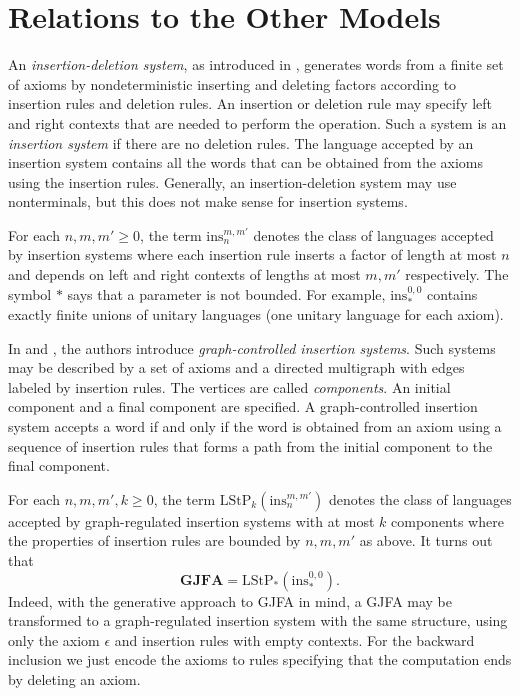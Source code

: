 \documentclass{ws-ijmpc}
\begin{document}
\section{\label{sec:Relations-to-Other}Relations to the Other Models}

An \emph{insertion-deletion system}, as introduced in \citep{reaPAU4},
generates words from a finite set of axioms by nondeterministic inserting
and deleting factors according to insertion rules and deletion rules.
An insertion or deletion rule may specify left and right contexts
that are needed to perform the operation. Such a system is an \emph{insertion
system }if there are no deletion rules. The language accepted by an
insertion system contains all the words that can be obtained from
the axioms using the insertion rules. Generally, an insertion-deletion
system may use nonterminals, but this does not make sense for insertion
systems.

For each $n,m,m'\ge0$, the term $\mathrm{ins}_{n}^{m,m'}$ denotes
the class of languages accepted by insertion systems where each insertion
rule inserts a factor of length at most $n$ and depends on left and
right contexts of lengths at most $m,m'$ respectively. The symbol
$\ast$ says that a parameter is not bounded. For example, $\mathrm{ins}_{\ast}^{0,0}$
contains exactly finite unions of unitary languages (one unitary language
for each axiom).

In \citep{reaALH1} and \citep{reaVER1}, the authors introduce \emph{graph-controlled
insertion systems}. Such systems may be described by a set of axioms
and a directed multigraph with edges labeled by insertion rules. The
vertices are called \emph{components}. An initial component and a
final component are specified. A graph-controlled insertion system
accepts a word if and only if the word is obtained from an axiom using
a sequence of insertion rules that forms a path from the initial component
to the final component.

For each $n,m,m',k\ge0$, the term $\mathrm{LStP}_{k}\!\left(\mathrm{ins}_{n}^{m,m'}\right)$
denotes the class of languages accepted by graph-regulated insertion
systems with at most $k$ components where the properties of insertion
rules are bounded by $n,m,m'$ as above. It turns out that\emph{ 
\[
\mathbf{GJFA}=\mathrm{LStP}_{\ast}\!\left(\mathrm{ins}_{\ast}^{0,0}\right).
\]
}Indeed, with the generative approach to GJFA in mind, a GJFA may
be transformed to a graph-regulated insertion system with the same
structure, using only the axiom $\epsilon$ and insertion rules with
empty contexts. For the backward inclusion we just encode the axioms
to rules specifying that the computation ends by deleting an axiom.
\end{document}
